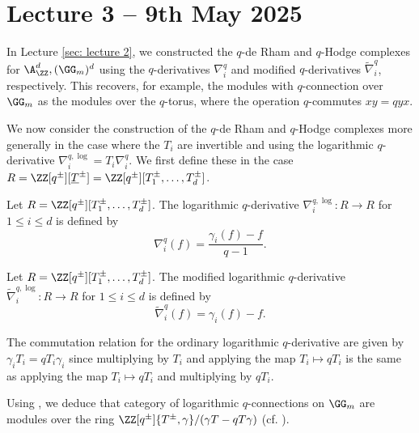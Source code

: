 \section{Lecture 3 -- 9th May 2025}\label{sec: lecture 3}
In Lecture \ref{sec: lecture 2}, we constructed the $q$-de Rham and $q$-Hodge complexes for $\A^{d}_{\ZZ},(\GG_{m})^{d}$ using the $q$-derivatives $\nabla_{i}^{q}$ and modified $q$-derivatives $\widetilde{\nabla}_{i}^{q}$, respectively. This recovers, for example, the modules with $q$-connection over $\GG_{m}$ as the modules over the $q$-torus, where the operation $q$-commutes $xy=qyx$. 

We now consider the construction of the $q$-de Rham and $q$-Hodge complexes more generally in the case where the $T_{i}$ are invertible and using the logarithmic $q$-derivative $\nabla_{i}^{q,\log}=T_{i}\nabla_{i}^{q}$. We first define these in the case $R=\ZZ[q^{\pm}][\underline{T}^{\pm}]=\ZZ[q^{\pm}][T_{1}^{\pm},\dots,T_{d}^{\pm}]$. 
\begin{definition}\label{def: logarithmic q-derivative}
    Let $R=\ZZ[q^{\pm}][T_{1}^{\pm},\dots,T_{d}^{\pm}]$. The logarithmic $q$-derivative $\nabla_{i}^{q,\log}:R\to R$ for $1\leq i\leq d$ is defined by 
    $$\nabla_{i}^{q}(f)=\frac{\gamma_{i}(f)-f}{q-1}.$$
\end{definition}
\begin{definition}\label{def: modified logarithmic q-derivative}
    Let $R=\ZZ[q^{\pm}][T_{1}^{\pm},\dots,T_{d}^{\pm}]$. The modified logarithmic $q$-derivative $\widetilde{\nabla}_{i}^{q,\log}:R\to R$ for $1\leq i\leq d$ is defined by 
    $$\widetilde{\nabla}_{i}^{q}(f)=\gamma_{i}(f)-f.$$
\end{definition}
\begin{remark}\label{rmk: commutation for log q-connections}
    The commutation relation for the ordinary logarithmic $q$-derivative are given by $\gamma_{i}T_{i}=qT_{i}\gamma_{i}$ since multiplying by $T_{i}$ and applying the map $T_{i}\mapsto qT_{i}$ is the same as applying the map $T_{i}\mapsto qT_{i}$ and multiplying by $qT_{i}$. 
\end{remark}
\begin{example}
    Using , we deduce that category of logarithmic $q$-connections on $\GG_{m}$ are modules over the ring $\ZZ[q^{\pm}]\{T^{\pm},\gamma\}/(\gamma T-q T\gamma)$ (cf. ). 
\end{example}

